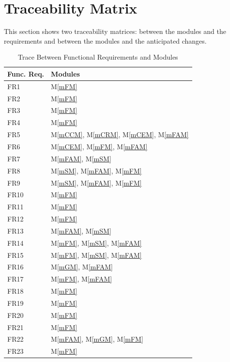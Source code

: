 \documentclass[12pt, titlepage]{article}
\newcommand{\mref}[1]{M\ref{#1}}
\begin{document}
\section{Traceability Matrix} \label{SecTM}

This section shows two traceability matrices: between the modules and the
requirements and between the modules and the anticipated changes.

\begin{table}[H]
\centering
\begin{tabular}{p{} p{}}
\toprule
\textbf{Func. Req.} & \textbf{Modules}\\
\midrule
FR1 & \mref{mFM}\\
FR2 & \mref{mFM}\\
FR3 & \mref{mFM}\\
FR4 & \mref{mFM}\\
FR5 & \mref{mCCM}, \mref{mCRM}, \mref{mCEM}, \mref{mFAM}\\
FR6 & \mref{mCEM}, \mref{mFM}, \mref{mFAM}\\
FR7 & \mref{mFAM}, \mref{mSM}\\
FR8 & \mref{mSM}, \mref{mFAM}, \mref{mFM}\\
FR9 & \mref{mSM}, \mref{mFAM}, \mref{mFM}\\
FR10 & \mref{mFM}\\
FR11 & \mref{mFM}\\
FR12 & \mref{mFM}\\
FR13 & \mref{mFAM}, \mref{mSM}\\
FR14 & \mref{mFM}, \mref{mSM}, \mref{mFAM}\\
FR15 & \mref{mFM}, \mref{mSM}, \mref{mFAM}\\
FR16 & \mref{mGM}, \mref{mFAM}\\
FR17 & \mref{mFM}, \mref{mFAM}\\
FR18 & \mref{mFM}\\
FR19 & \mref{mFM}\\
FR20 & \mref{mFM}\\
FR21 & \mref{mFM}\\
FR22 & \mref{mFAM}, \mref{mGM}, \mref{mFM}\\
FR23 & \mref{mFM} \\
\bottomrule
\end{tabular}
\caption{Trace Between Functional Requirements and Modules}
\label{TblFRT}
\end{table}
\end{document}
